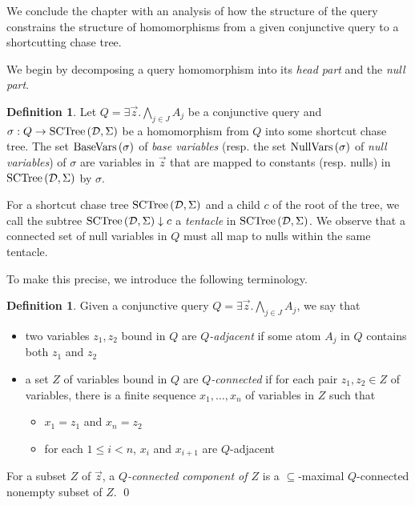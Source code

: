 \documentclass[12pt]{report}
\theoremstyle{plain}
\theoremstyle{definition}
\newtheorem{definition}[theorem]{Definition}
\newcommand{\BaseVars}[1]{\ensuremath{\normalfont{\textrm{BaseVars}} \left( #1 \right)}}
\newcommand{\NullVars}[1]{\ensuremath{\normalfont{\textrm{NullVars}} \left( #1 \right)}}
\newcommand{\SCTree}[2]{\ensuremath{\normalfont{\textrm{SCTree}} \left( #1, #2 \right)}}
\begin{document}
We conclude the chapter with an analysis of how the structure of the query constrains the structure of homomorphisms from a given conjunctive query to a shortcutting chase tree.

We begin by decomposing a query homomorphism into its \emph{head part} and the \emph{null part}.

\begin{definition}
  Let $Q = \exists \vec{z}. \bigwedge_{j \in J} A_j$ be a conjunctive query and $\sigma: Q \rightarrow \SCTree{\mathcal{D}}{\Sigma}$ be a homomorphism from $Q$ into some shortcut chase tree. The set $\BaseVars{\sigma}$ of \emph{base variables} (resp. the set $\NullVars{\sigma}$ of \emph{null variables}) of $\sigma$ are variables in $\vec{z}$ that are mapped to constants (resp. nulls) in $\SCTree{\mathcal{D}}{\Sigma}$ by $\sigma$.
\end{definition}

For a shortcut chase tree $\SCTree{\mathcal{D}}{\Sigma}$ and a child $c$ of the root of the tree, we call the subtree $\SCTree{\mathcal{D}}{\Sigma} \downarrow c$ a \emph{tentacle} in $\SCTree{\mathcal{D}}{\Sigma}$. We observe that a connected set of null variables in $Q$ must all map to nulls within the same tentacle.

To make this precise, we introduce the following terminology.

\begin{definition}
  Given a conjunctive query $Q = \exists \vec{z}. \bigwedge_{j \in J} A_j$, we say that
  \begin{itemize}
    \item two variables $z_1, z_2$ bound in $Q$ are \emph{$Q$-adjacent} if some atom $A_j$ in $Q$ contains both $z_1$ and $z_2$
    \item a set $Z$ of variables bound in $Q$ are \emph{$Q$-connected} if for each pair $z_1, z_2 \in Z$ of variables, there is a finite sequence $x_1, \ldots, x_n$ of variables in $Z$ such that
    \begin{itemize}
      \item $x_1 = z_1$ and $x_n = z_2$
      \item for each $1 \leq i < n$, $x_i$ and $x_{i+1}$ are $Q$-adjacent
    \end{itemize}
  \end{itemize}
  For a subset $Z$ of $\vec{z}$, a \emph{$Q$-connected component of $Z$} is a $\subseteq$-maximal $Q$-connected nonempty subset of $Z$.
  \qed
\end{definition}
\end{document}
